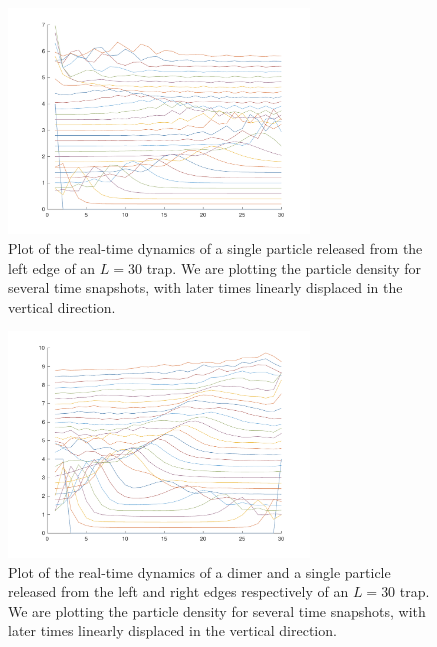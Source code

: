 \documentclass[aps,longbibliography,final,prl,onecolumn,superscriptaddress,nofootinbib,floatfix,11pt]{revtex4-1}
\begin{document}
\begin{figure}
\centering
\includegraphics[width=8cm]{particle_1}
\caption{Plot of the real-time dynamics of a single particle released from the left edge of an $L=30$ trap.  We are plotting the particle density for several time snapshots, with later times linearly displaced in the vertical direction.}
\label{particle}
\end{figure}
 
\begin{figure}
\centering
\includegraphics[width=8cm]{dimer_particle_1}
\caption{Plot of the real-time dynamics of a dimer and a single particle released from the left and right edges respectively of an $L=30$ trap.  We are plotting the particle density for
several time snapshots, with later times linearly displaced in the vertical
direction.}
\label{dimer_particle}
\end{figure}
 

\end{document}
